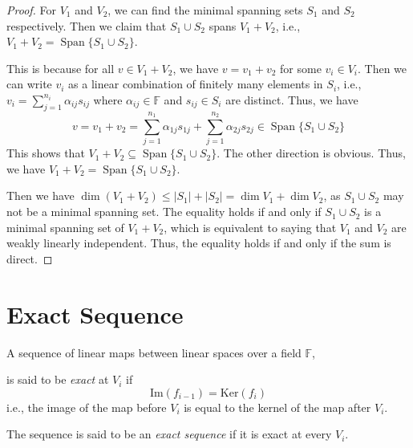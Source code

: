 \documentclass[
	11pt, %
	fleqn, %
	a4paper, %
]{LegrandOrangeBook}
\renewcommand{\ker}[1]{\text{Ker}(#1)} %
\renewcommand{\Im}[1]{\text{Im}(#1)} %
\newcommand{\F}{\mathbb{F}} %
\DeclareMathOperator{\Span}{Span}
\begin{document}
\begin{proof}
    For $V_1$ and $V_2$, we can find the minimal spanning sets $S_1$ and $S_2$ respectively. Then we claim that $S_1 \cup S_2$ spans $V_1 + V_2$, i.e., $V_1 + V_2 = \Span\{S_1 \cup S_2\}$. 
    
    This is because for all $v \in V_1 + V_2$, we have $v = v_1 + v_2$ for some $v_i \in V_i$. Then we can write $v_i$ as a linear combination of finitely many elements in $S_i$, i.e., $v_i = \sum_{j=1}^{n_i} \alpha_{ij} s_{ij}$ where $\alpha_{ij} \in \F$ and $s_{ij} \in S_i$ are distinct. Thus, we have 
    \[
        v = v_1 + v_2 = \sum_{j=1}^{n_1} \alpha_{1j} s_{1j} + \sum_{j=1}^{n_2} \alpha_{2j} s_{2j} \in \Span\{S_1 \cup S_2\}
    \]
    This shows that $V_1 + V_2 \subseteq \Span\{S_1 \cup S_2\}$. The other direction is obvious. Thus, we have $V_1 + V_2 = \Span\{S_1 \cup S_2\}$.

    Then we have $\dim{(V_1 + V_2)} \leq |S_1| + |S_2| = \dim{V_1} + \dim{V_2}$, as $S_1 \cup S_2$ may not be a minimal spanning set. The equality holds if and only if $S_1 \cup S_2$ is a minimal spanning set of $V_1 + V_2$, which is equivalent to saying that $V_1$ and $V_2$ are weakly linearly independent. Thus, the equality holds if and only if the sum is direct.
\end{proof}

\newpage

\section{Exact Sequence}

\begin{definition}
    A sequence of linear maps between linear spaces over a field $\F$,
    \begin{center}
    \end{center}
    is said to be \emph{exact} at $V_i$ if 
    \[ \Im{f_{i-1}} = \ker{f_i} \]
    i.e., the image of the map before $V_i$ is equal to the kernel of the map after $V_i$.

    The sequence is said to be an \emph{exact sequence} if it is exact at every $V_i$.
\end{definition}
\end{document}
